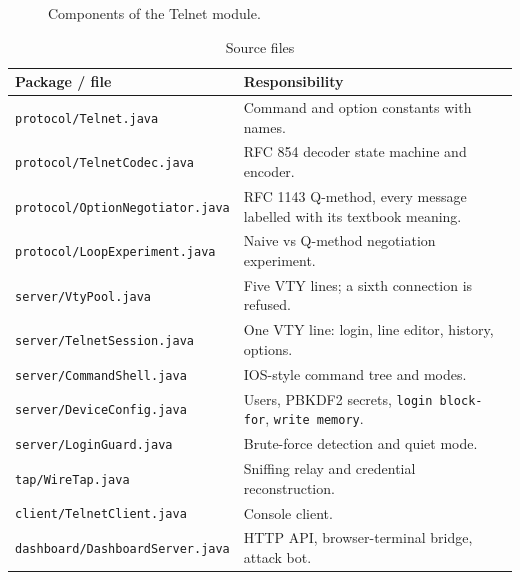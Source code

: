 \documentclass[11pt,a4paper]{article}
\begin{document}
\begin{figure}[H]
\centering
{}
\caption{Components of the Telnet module.}
\end{figure}

\begin{table}[H]
\centering
\caption{Source files}
\small
\begin{tabularx}{\textwidth}{@{}lY@{}}
\toprule
\textbf{Package / file} & \textbf{Responsibility} \\ \midrule
\texttt{protocol/Telnet.java} & Command and option constants with names. \\
\texttt{protocol/TelnetCodec.java} & RFC 854 decoder state machine and encoder. \\
\texttt{protocol/OptionNegotiator.java} & RFC 1143 Q-method, every message labelled with its textbook meaning. \\
\texttt{protocol/LoopExperiment.java} & Naive vs Q-method negotiation experiment. \\
\texttt{server/VtyPool.java} & Five VTY lines; a sixth connection is refused. \\
\texttt{server/TelnetSession.java} & One VTY line: login, line editor, history, options. \\
\texttt{server/CommandShell.java} & IOS-style command tree and modes. \\
\texttt{server/DeviceConfig.java} & Users, PBKDF2 secrets, \texttt{login block-for}, \texttt{write memory}. \\
\texttt{server/LoginGuard.java} & Brute-force detection and quiet mode. \\
\texttt{tap/WireTap.java} & Sniffing relay and credential reconstruction. \\
\texttt{client/TelnetClient.java} & Console client. \\
\texttt{dashboard/DashboardServer.java} & HTTP API, browser-terminal bridge, attack bot. \\ \bottomrule
\end{tabularx}
\end{table}
\end{document}
